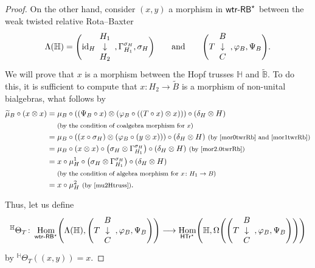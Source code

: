 \documentclass[pdftex]{sigma}
\numberwithin{equation}{section}
\DeclareMathOperator{\Hom}{Hom}
\begin{document}
\begin{proof}
On the other hand, consider $(x,y)$ a morphism in ${\sf wtr}\textnormal{-}{\sf RB}^{\star}$ between the weak twisted relative Rota--Baxter
\[
\Lambda(\mathbb{H})=\Biggl({\rm id}_{H}\begin{array}{c}H_{1}\\\downarrow\\H_{2}\end{array},\Gamma_{H_{1}}^{\sigma_{H}},\sigma_{H}\biggr)
\qquad \text{and} \qquad \Biggl(T\begin{array}{c}B\\\downarrow\\C\end{array},\varphi_{B},\Psi_{B}\Biggr).
\]
 We will prove that $x$ is a morphism between the Hopf trusses $\mathbb{H}$ and $\widetilde{\mathbb{B}}$. To do this, it is sufficient to compute that $x\colon H_{2}\rightarrow \widetilde{B}$ is a morphism of non-unital bialgebras, what follows by
\begin{align*}
\widetilde{\mu}_{B}\circ(x\otimes x)
={}&\mu_{B}\circ((\Psi_{B}\circ x)\otimes(\varphi_{B}\circ((T\circ x)\otimes x)))\circ(\delta_{H}\otimes H)\\
&{}\text{\footnotesize\textnormal{(by the condition of coalgebra morphism for $x$)}}\\
={}&\mu_{B}\circ((x\circ \sigma_{H})\otimes(\varphi_{B}\circ(y\otimes x)))\circ(\delta_{H}\otimes H)\ \text{\footnotesize\textnormal{(by \eqref{mor0twrRb} and \eqref{mor1twrRb})}}\\
={}&\mu_{B}\circ(x\otimes x)\circ\bigl(\sigma_{H}\otimes\Gamma_{H_{1}}^{\sigma_{H}}\bigr)\circ(\delta_{H}\otimes H)\ \text{\footnotesize\textnormal{(by \eqref{mor2.0twrRb})}}\\
={}&x\circ\mu_{H}^{1}\circ\bigl(\sigma_{H}\otimes \Gamma_{H_{1}}^{\sigma_{H}}\bigr)\circ(\delta_{H}\otimes H)\\
&{}\text{\footnotesize\textnormal{(by the condition of algebra morphism for $x\colon H_{1}\rightarrow B$)}}\\
={}&x\circ\mu_{H}^{2}\ \text{\footnotesize\textnormal{(by \eqref{mu2Htruss})}}.
\end{align*}

Thus, let us define
\begin{gather*}
{}^{\mathbb{H}}\Theta_{T}\colon \Hom_{{\sf wtr}\textnormal{-}{\sf RB}^{\star}}\Biggl(\Lambda(\mathbb{H}),\Biggl(T\begin{array}{c}B\\\downarrow\\C\end{array},\varphi_{B},\Psi_{B}\Biggr)\Biggr)\longrightarrow \Hom_{{\sf HTr}^{\star}}\Biggl(\mathbb{H},\Omega\Biggl(\Biggl(T\begin{array}{c}B\\\downarrow\\C\end{array},\varphi_{B},\Psi_{B}\Biggr)\Biggr)\Biggr)
\end{gather*}
by ${}^{\mathbb{H}}\Theta_{T}((x,y))=x$.


\end{proof}
\end{document}
